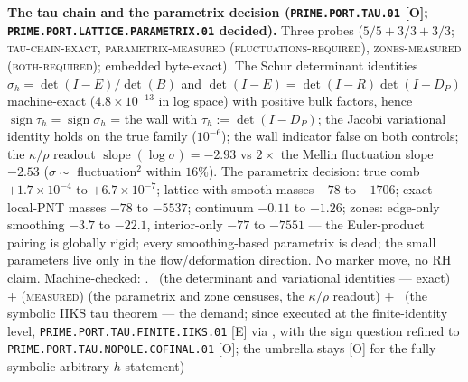 \par\smallskip\noindent\textbf{The tau chain and the parametrix
decision (\texttt{PRIME.PORT.\allowbreak TAU.01} [O];
\texttt{PRIME.PORT.LATTICE.\allowbreak PARAMETRIX.01} decided).}
Three probes ($5/5 + 3/3 + 3/3$; \textsc{tau-chain-exact},
\textsc{parametrix-measured (fluctuations-required)},
\textsc{zones-measured (both-required)}; embedded byte-exact).
The Schur determinant identities $\sigma_h = \det(I -
E)/\det(B)$ and $\det(I - E) = \det(I - R)\det(I - D_P)$
machine-exact ($4.8\times10^{-13}$ in log space) with positive
bulk factors, hence $\operatorname{sign}\tau_h =
\operatorname{sign}\sigma_h$ = the wall with $\tau_h := \det(I -
D_P)$; the Jacobi variational identity holds on the true family
($10^{-6}$); the wall indicator false on both controls; the
$\kappa/\rho$ readout $\operatorname{slope}(\log\sigma) = -2.93$
vs $2\times$ the Mellin fluctuation slope $-2.53$ ($\sigma \sim$
fluctuation$^2$ within $16\%$).  The parametrix decision: true
comb $+1.7\times10^{-4}$ to $+6.7\times10^{-7}$; lattice with
smooth masses $-78$ to $-1706$; exact local-PNT masses $-78$ to
$-5537$; continuum $-0.11$ to $-1.26$; zones: edge-only
smoothing $-3.7$ to $-22.1$, interior-only $-77$ to $-7551$ ---
the Euler-product pairing is globally rigid; every
smoothing-based parametrix is dead; the small parameters live
only in the flow/deformation direction.  No marker move, no RH
claim.
Machine-checked: .
\mE\ (the determinant and variational identities --- exact) $+$
(\textsc{measured}) (the parametrix and zone censuses, the
$\kappa/\rho$ readout) $+$ \mO\ (the symbolic IIKS tau theorem
--- the demand; since executed at the finite-identity level,
\texttt{PRIME.PORT.TAU.FINITE.IIKS.01} [E] via
, with the sign
question refined to \texttt{PRIME.PORT.TAU.NOPOLE.COFINAL.01}
[O]; the umbrella stays [O] for the fully symbolic
arbitrary-$h$ statement)
\par\smallskip


